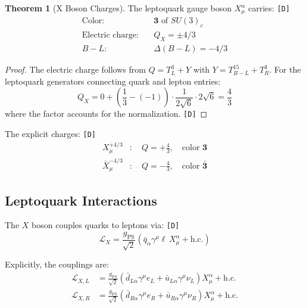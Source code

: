 \documentclass[11pt,a4paper]{article}
\newcommand{\tagD}{\textcolor{green!50!black}{\texttt{[D]}}}
\theoremstyle{definition}
\newtheorem{theorem}{Theorem}[section]
\begin{document}
\begin{theorem}[X Boson Charges]
\label{thm:x-charges}
The leptoquark gauge boson $X^{\alpha}_\mu$ carries: \tagD{}
\begin{equation}
\label{eq:x-charges}
\boxed{
\begin{aligned}
\text{Color:} &\quad \mathbf{3} \text{ of } SU(3)_c \\
\text{Electric charge:} &\quad Q_X = \pm 4/3 \\
B - L: &\quad \Delta(B - L) = -4/3
\end{aligned}
}
\end{equation}
\end{theorem}

\begin{proof}
The electric charge follows from $Q = T^3_L + Y$ with $Y = T^{15}_{B-L} + T^3_R$.
For the leptoquark generators connecting quark and lepton entries:
\begin{equation}
\label{eq:x-charge-derivation}
Q_X = 0 + \left(\frac{1}{3} - (-1)\right) \cdot \frac{1}{2\sqrt{6}} \cdot 2\sqrt{6} = \frac{4}{3}
\end{equation}
where the factor accounts for the normalization. \tagD{}
\end{proof}

The explicit charges: \tagD{}
\begin{align}
\label{eq:x-plus}
X^{+4/3}_\mu &: \quad Q = +\frac{4}{3}, \quad \text{color } \mathbf{3} \\
\label{eq:x-minus}
\bar{X}^{-4/3}_\mu &: \quad Q = -\frac{4}{3}, \quad \text{color } \bar{\mathbf{3}}
\end{align}

\subsection{Leptoquark Interactions}
\label{subsec:lq-interactions}

The $X$ boson couples quarks to leptons via: \tagD{}
\begin{equation}
\label{eq:x-coupling}
\mathcal{L}_{X} = \frac{g_{\text{PS}}}{\sqrt{2}} \left(
\bar{q}_\alpha \gamma^\mu \ell \, X^{\alpha}_\mu + \text{h.c.}
\right)
\end{equation}

Explicitly, the couplings are:
\begin{align}
\label{eq:x-coupling-left}
\mathcal{L}_{X,L} &= \frac{g_{\text{PS}}}{\sqrt{2}} \left(
\bar{d}_{L\alpha} \gamma^\mu e_L + \bar{u}_{L\alpha} \gamma^\mu \nu_L
\right) X^{\alpha}_\mu + \text{h.c.} \\
\label{eq:x-coupling-right}
\mathcal{L}_{X,R} &= \frac{g_{\text{PS}}}{\sqrt{2}} \left(
\bar{d}_{R\alpha} \gamma^\mu e_R + \bar{u}_{R\alpha} \gamma^\mu \nu_R
\right) X^{\alpha}_\mu + \text{h.c.}
\end{align}
\end{document}
